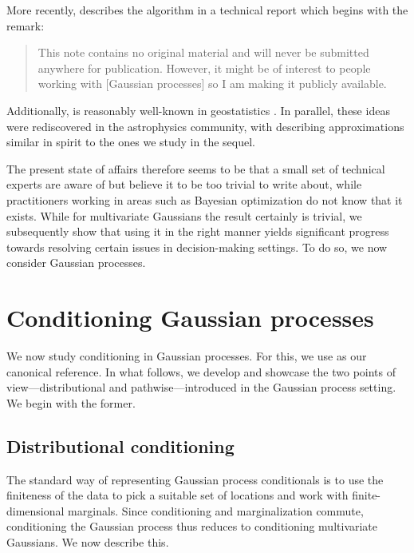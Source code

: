 \documentclass[11pt]{book}
\begin{document}
More recently, \textcite{doucet10} describes the algorithm in a technical report which begins with the remark: 

\begin{quotation}
This note contains no original material and will never be submitted anywhere for publication. However, it might be of interest to people working with [Gaussian processes] so I am making it publicly available.
\end{quotation}

Additionally,  is reasonably well-known in geostatistics \cite{journel78,defouquet94,emery07,oliver96}.
In parallel, these ideas were rediscovered in the astrophysics community, with \textcite{hoffman91} describing approximations similar in spirit to the ones we study in the sequel.

The present state of affairs therefore seems to be that a small set of technical experts are aware of  but believe it to be too trivial to write about, while practitioners working in areas such as Bayesian optimization do not know that it exists.
While for multivariate Gaussians the result certainly is trivial, we subsequently show that using it in the right manner yields significant progress towards resolving certain issues in decision-making settings.
To do so, we now consider Gaussian processes.

\section{Conditioning Gaussian processes}

We now study conditioning in Gaussian processes.
For this, we use \textcite{rasmussen06} as our canonical reference.
In what follows, we develop and showcase the two points of view---distributional and pathwise---introduced in the Gaussian process setting.
We begin with the former.

\subsection{Distributional conditioning}

The standard way of representing Gaussian process conditionals is to use the finiteness of the data to pick a suitable set of locations and work with finite-dimensional marginals.
Since conditioning and marginalization commute, conditioning the Gaussian process thus reduces to conditioning multivariate Gaussians.
We now describe this.
\end{document}
